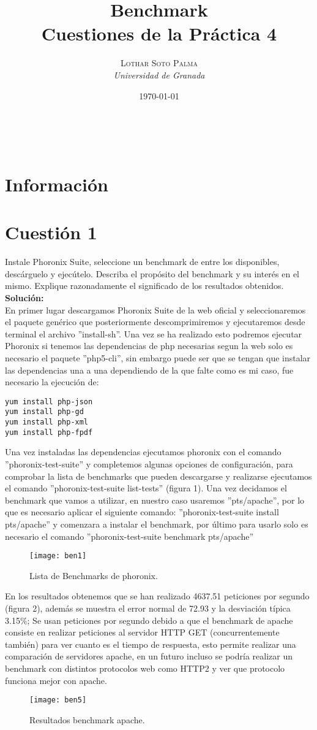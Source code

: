 \documentclass[a4paper, 10pt]{article} %
\title{\textbf{Benchmark}\\ %
\vspace{20 pt}
Cuestiones de la Práctica 4} %
\author{\textsc{Lothar Soto Palma} %
\\{\textit{Universidad de Granada}}} %
\date{\today} %
\makeatletter
\renewcommand{\maketitle}{ %
\begin{center} %
{\Huge\@title} %
\end{center}

\vspace{20pt} %

\begin{flushright} %
{\large\@author} %
\\\@date %

\vspace{40pt} %
\end{flushright}
\renewcommand{\baselinestretch}{0.5}

}
\makeatother
\begin{document}
\thispagestyle{empty}
\maketitle
\pagebreak
\thispagestyle{empty}
\tableofcontents
\pagebreak
\listoffigures
\setcounter{page}{1}
\section{Información}
\section{Cuestión 1}
Instale Phoronix Suite, seleccione un benchmark de entre los disponibles, descárguelo y ejecútelo. Describa el propósito del benchmark y su interés en el mismo. Explique razonadamente el significado de los resultados obtenidos.\\
\textbf{Solución:}\\
En primer lugar descargamos Phoronix Suite de la web oficial \cite{1} y seleccionaremos el paquete genérico que posteriormente descomprimiremos y ejecutaremos desde terminal el archivo ''install-sh''. Una vez se ha realizado esto podremos ejecutar Phoronix si tenemos las dependencias de php necesarias segun la web solo es necesario el paquete ''php5-cli'', sin embargo puede ser que se tengan que instalar las dependencias una a una dependiendo de la que falte como es mi caso, fue necesario la ejecución de:
\begin{verbatim}
yum install php-json
yum install php-gd
yum install php-xml
yum install php-fpdf
\end{verbatim}
Una vez instaladas las dependencias ejecutamos phoronix con el comando ''phoronix-test-suite'' y completemos algunas opciones de configuración, para comprobar la lista de benchmarks que pueden descargarse y realizarse ejecutamos el comando ''phoronix-test-suite list-tests'' (figura 1). Una vez decidamos el benchmark que vamos a utilizar, en nuestro caso usaremos ''pts/apache'', por lo que es necesario aplicar el siguiente comando: ''phoronix-test-suite install pts/apache'' y comenzara a instalar el benchmark, por último para usarlo solo es necesario el comando ''phoronix-test-suite benchmark pts/apache''
\begin{figure}[H]
\centering 
\texttt{[image: ben1]} 
\caption{Lista de Benchmarks de phoronix.} 
\label{contexto:figura} 
\end{figure}
En los resultados obtenemos que se han realizado 4637.51 peticiones por segundo (figura 2), además se muestra el error normal de 72.93 y la desviación típica 3.15\%; Se usan peticiones por segundo debido a que el benchmark de apache consiste en realizar peticiones al servidor HTTP GET (concurrentemente también) para ver cuanto es el tiempo de respuesta, esto permite realizar una comparación de servidores apache, en un futuro incluso se podría realizar un benchmark con distintos protocolos web como HTTP2 y ver que protocolo funciona mejor con apache.
\begin{figure}[H]
\centering 
\texttt{[image: ben5]} 
\caption{Resultados benchmark apache.} 
\label{contexto:figura} 
\end{figure}
\end{document}
